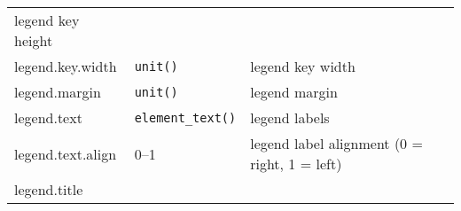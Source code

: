 \begin{longtable}[c]{@{}lll@{}}
\begin{minipage}[t]{0.58\columnwidth}\raggedright\strut
legend key height
\strut\end{minipage}\tabularnewline
\begin{minipage}[t]{0.27\columnwidth}\raggedright\strut
legend.key.width
\strut\end{minipage} &
\begin{minipage}[t]{0.35\columnwidth}\raggedright\strut
\texttt{unit()}
\strut\end{minipage} &
\begin{minipage}[t]{0.58\columnwidth}\raggedright\strut
legend key width
\strut\end{minipage}\tabularnewline
\begin{minipage}[t]{0.27\columnwidth}\raggedright\strut
legend.margin
\strut\end{minipage} &
\begin{minipage}[t]{0.35\columnwidth}\raggedright\strut
\texttt{unit()}
\strut\end{minipage} &
\begin{minipage}[t]{0.58\columnwidth}\raggedright\strut
legend margin
\strut\end{minipage}\tabularnewline
\begin{minipage}[t]{0.27\columnwidth}\raggedright\strut
legend.text
\strut\end{minipage} &
\begin{minipage}[t]{0.35\columnwidth}\raggedright\strut
\texttt{element\_text()}
\strut\end{minipage} &
\begin{minipage}[t]{0.58\columnwidth}\raggedright\strut
legend labels
\strut\end{minipage}\tabularnewline
\begin{minipage}[t]{0.27\columnwidth}\raggedright\strut
legend.text.align
\strut\end{minipage} &
\begin{minipage}[t]{0.35\columnwidth}\raggedright\strut
0--1
\strut\end{minipage} &
\begin{minipage}[t]{0.58\columnwidth}\raggedright\strut
legend label alignment (0 = right, 1 = left)
\strut\end{minipage}\tabularnewline
\begin{minipage}[t]{0.27\columnwidth}\raggedright\strut
legend.title
\strut\end{minipage} &
\begin{minipage}[t]{0.35\columnwidth}\raggedright\strut

\end{minipage}
\end{longtable}
